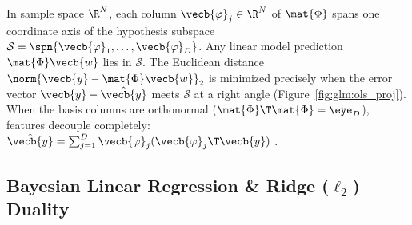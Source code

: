 \documentclass[../../../../master.tex]{subfiles}
\begin{document}
\begin{intuition}
In sample space $\R^N$, each column $\vecb{\varphi}_j \in \R^N$ of $\mat{\Phi}$ spans one coordinate axis of the hypothesis subspace $\mathcal{S} = \spn\{\vecb{\varphi}_1,\dots,\vecb{\varphi}_D\}$. Any linear model prediction $\mat{\Phi}\vecb{w}$ lies in $\mathcal{S}$. The Euclidean distance $\norm{\vecb{y} - \mat{\Phi}\vecb{w}}_2$ is minimized precisely when the error vector $\vecb{y} - \hat{\vecb{y}}$ meets $\mathcal{S}$ at a right angle (Figure~\ref{fig:glm:ols_proj}). When the basis columns are orthonormal ($\mat{\Phi}\T\mat{\Phi} = \eye_D$), features decouple completely: $\hat{\vecb{y}} = \sum_{j=1}^D \vecb{\varphi}_j(\vecb{\varphi}_j\T\vecb{y})$ .
\end{intuition}


\subsection{Bayesian Linear Regression \& Ridge ($\ell_2$) Duality}
\label{subsec:glm:ridge}
\end{document}
